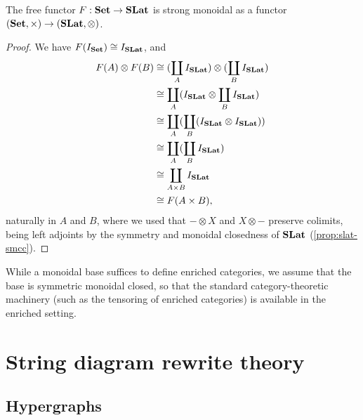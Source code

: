 \begin{corollary}\label{cor:slat-free-monoidal}
	The free functor $F : \mathbf{Set} \to \mathbf{SLat}$ is strong monoidal as a functor $(\mathbf{Set}, \times) \to (\mathbf{SLat}, \otimes)$.
\end{corollary}
\begin{proof}
	We have $F(I_{\mathbf{Set}}) \cong I_{\mathbf{SLat}}$, and
	\begin{align*}
		F(A) \otimes F(B) & \cong (\coprod_{A} I_{\mathbf{SLat}}) \otimes (\coprod_{B} I_{\mathbf{SLat}}) \\
		                  & \cong \coprod_{A} (I_{\mathbf{SLat}} \otimes \coprod_{B} I_{\mathbf{SLat}})   \\
		                  & \cong \coprod_{A} (\coprod_{B} (I_{\mathbf{SLat}} \otimes I_{\mathbf{SLat}})) \\
		                  & \cong \coprod_{A} (\coprod_{B} I_{\mathbf{SLat}})                              \\
		                  & \cong \coprod_{A \times B} I_{\mathbf{SLat}}                                   \\
		                  & \cong F(A \times B),
	\end{align*}
	naturally in $A$ and $B$, where we used that $- \otimes X$ and $X \otimes -$ preserve colimits, being left adjoints by the symmetry and monoidal closedness of $\mathbf{SLat}$ (\cref{prop:slat-smcc}).
\end{proof}

While a monoidal base suffices to define enriched categories, we assume that the base is symmetric monoidal closed, so that the standard category-theoretic machinery (such as the tensoring of enriched categories) is available in the enriched setting.


\section{String diagram rewrite theory}
\label{sec:appendix:hyp}

\subsection{Hypergraphs}

